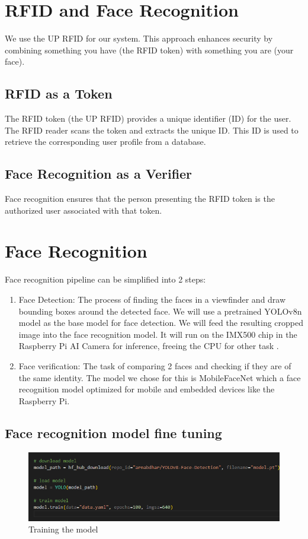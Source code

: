 \section{RFID and Face Recognition}
 We use the UP RFID for our system. This approach enhances security by combining something you have (the RFID token) with something you are (your face).
 \subsection{RFID as a Token}
 The RFID token (the UP RFID) provides a unique identifier (ID) for the user. The RFID reader scans the token and extracts the unique ID. This ID is used to retrieve the corresponding user profile from a database.
 \subsection{Face Recognition as a Verifier}
  Face recognition ensures that the person presenting the RFID token is the authorized user associated with that token.
 	
\section{Face Recognition}
Face recognition pipeline can be simplified into 2 steps:
\begin{enumerate}
	\item Face Detection: The process of finding the faces in a viewfinder and draw bounding boxes around the detected face. We will use a pretrained YOLOv8n model
	as the base model for face detection. We will feed the resulting cropped image into the face recognition model. It will run on the IMX500 chip in the Raspberry Pi AI Camera for inference, freeing the CPU for other task \cite{sony_imx500}.
	
	\item Face verification: The task of comparing 2 faces and checking if they are of the same identity. The model we chose for this is MobileFaceNet which a face recognition model optimized for mobile and embedded devices like the Raspberry Pi\cite{chen2018mobilefacenets}.
\end{enumerate}
\subsection{Face recognition model fine tuning}

\begin{figure}[h] %
	\centering
	\includegraphics[width=1\textwidth]{figures/chapter3/train.png} %
	\caption{Training the model}
	\label{fig:api}
\end{figure} 


